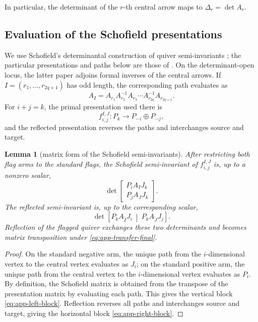 \documentclass[11pt]{amsart}
\newtheorem{lemma}[theorem]{Lemma}
\theoremstyle{definition}
\theoremstyle{remark}
\begin{document}
In particular, the determinant of the $r$-th central arrow maps to
$\Delta_r=\det A_r$.

\subsection{Evaluation of the Schofield presentations}

We use Schofield's determinantal construction of quiver semi-invariants
\cite{SchofieldSemi}; the particular presentations and paths below are those
of \cite{FeiKroneckerII}.  On the determinant-open locus, the latter paper
adjoins formal
inverses of the central arrows.  If $I=(r_1,\ldots,r_{2q+1})$ has odd length, the
corresponding path evaluates as
\[ A_I=A_{r_1}A_{r_2}^{-1}A_{r_3}\cdots A_{r_{2q}}^{-1}A_{r_{2q+1}}. \]
For $i+j=k$, the primal presentation used there is
\[ f_{i,j}^{I,J}:P_k\longrightarrow P_{-i}\oplus P_{-j}, \]
and the reflected presentation reverses the paths and interchanges source
and target.

\begin{lemma}[matrix form of the Schofield semi-invariants]
\label{lem:app-Schofield-matrix}
After restricting both flag arms to the standard flags, the Schofield
semi-invariant of $f_{i,j}^{I,J}$ is, up to a nonzero scalar,
\begin{equation}
 \det
 \begin{bmatrix}
  P_iA_IJ_k\\[1mm]
  P_jA_JJ_k
 \end{bmatrix}.
 \label{eq:app-left-block}
\end{equation}
The reflected semi-invariant is, up to the corresponding scalar,
\begin{equation}
 \det\left[
  P_kA_{\overleftarrow I}J_i
  \ \middle|\ 
  P_kA_{\overleftarrow J}J_j
 \right].
 \label{eq:app-right-block}
\end{equation}
Reflection of the flagged quiver exchanges these two determinants and
becomes matrix transposition under \eqref{eq:app-transfer-final}.
\end{lemma}

\begin{proof}
On the standard negative arm, the unique path from the $i$-dimensional
vertex to the central vertex evaluates as $J_i$; on the standard positive
arm, the unique path from the central vertex to the $i$-dimensional vertex
evaluates as $P_i$.  By definition, the Schofield matrix is obtained from
the transpose of the presentation matrix by evaluating each path.  This
gives the vertical block \eqref{eq:app-left-block}.  Reflection reverses
all paths and interchanges source and target, giving the horizontal block
\eqref{eq:app-right-block}.
\end{proof}
\end{document}
